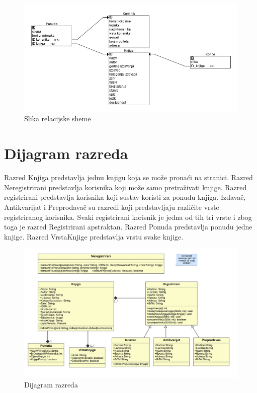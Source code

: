 		\begin{figure}[hbt!]
			\centering
			\includegraphics[width = \textwidth]{slike/Relacijska shema}
			\caption{Slika relacijske sheme}
			\label{fig:enter-label}
		\end{figure}
		
		\eject
			
		\section{Dijagram razreda}
		
			\raggedright{Razred Knjiga predstavlja jednu knjigu koja se može pronaći na stranici. Razred Neregistrirani predstavlja korisnika koji može samo pretraživati knjige. Razred registrirani predstavlja korisnika koji sustav koristi za ponudu knjiga. Izdavač, Antikvarijat i Preprodavač su razredi koji predstavljaju različite vrste registriranog korisnika. Svaki registrirani korisnik je jedna od tih tri vrste i zbog toga je razred Registrirani apstraktan. Razred Ponuda predstavlja ponudu jedne knjige. Razred VrstaKnjige predstavlja vrstu svake knjige.}\\
			
			\begin{figure}[h]
				\centering
				\includegraphics[width = \textwidth]{slike/dijagramKlasa.PNG}
				\caption{Dijagram razreda}
				\label{fig:enter-label}
			\end{figure}
			

